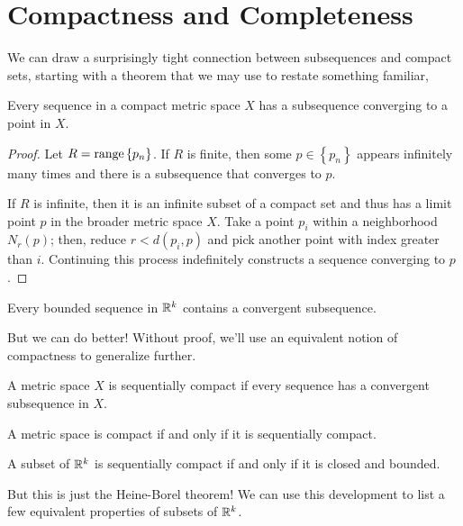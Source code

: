 \documentclass[../m131main.tex]{subfiles}
\begin{document}
\section{Compactness and Completeness}
We can draw a surprisingly tight connection between subsequences and compact sets, starting with a theorem that we may use to restate something familiar,

\begin{theorem}[]
    Every sequence in a compact metric space $X$ has a subsequence converging to a point in $X$.
\end{theorem}

\begin{proof}
    Let $R = \operatorname{range} \left\{ p_n \right\}$.
    If $R$ is finite, then some $p \in \left\{ p_n \right\}$ appears infinitely many times and there is a subsequence that converges to $p$.

    If $R$ is infinite, then it is an infinite subset of a compact set and thus has a limit point $p$ in the broader metric space $X$.
    Take a point $p_i$ within a neighborhood $N_r(p)$; then, reduce $r < d(p_i, p)$ and pick another point with index greater than $i$.
    Continuing this process indefinitely constructs a sequence converging to $p$.
\end{proof}

\begin{corollary}
    Every bounded sequence in $\mathbb{R}^k$ contains a convergent subsequence.
\end{corollary}

But we can do better!
Without proof, we'll use an equivalent notion of compactness to generalize further.

\begin{definition}
    A metric space $X$ is sequentially compact if every sequence has a convergent subsequence in $X$.
\end{definition}

\begin{theorem}[]
    A metric space is compact if and only if it is sequentially compact.
\end{theorem}

\begin{corollary}
    A subset of $\mathbb{R}^k$ is sequentially compact if and only if it is closed and bounded.
\end{corollary}

But this is just the Heine-Borel theorem!
We can use this development to list a few equivalent properties of subsets of $\mathbb{R}^k$.
\end{document}

